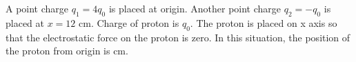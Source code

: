\item A point charge \( q_1 = 4q_0 \) is placed at origin. Another point charge \( q_2 = -q_0 \) is placed at \( x = 12 \text{ cm} \). Charge of proton is \( q_0 \). The proton is placed on x axis so that the electrostatic force on the proton is zero. In this situation, the position of the proton from origin is \underline{\hspace{2.5cm}} cm.